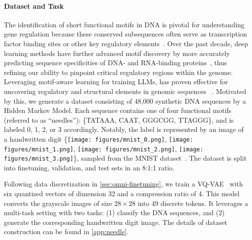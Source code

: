 \paragraph{Dataset and Task} The identification of short functional motifs in DNA is pivotal for understanding gene regulation because these conserved subsequences often serve as transcription factor binding sites or other key regulatory elements~\cite{tompa2005, avsec2021base}. Over the past decade, deep learning methods have further advanced motif discovery by more accurately predicting sequence specificities of DNA- and RNA-binding proteins~\cite{alipanahi2015predicting}, thus refining our ability to pinpoint critical regulatory regions within the genome. Leveraging motif-aware learning for training LLMs, has proven effective for uncovering regulatory and structural elements in genomic sequences ~\cite{wang2024multi, sanabria2024dna}. Motivated by this, we generate a dataset consisting of 48,000 synthetic DNA sequences by a Hidden Markov Model. Each sequence contains one of four functional motifs (referred to as ``needles''): \{TATAAA, CAAT, GGGCGG, TTAGGG\}, and is labeled 0, 1, 2, or 3 accordingly. Notably, the label is represented by an image of a handwritten digit \{\texttt{[image: figures/mnist\_0.png]}, \texttt{[image: figures/mnist\_1.png]}, \texttt{[image: figures/mnist\_2.png]}, \texttt{[image: figures/mnist\_3.png]}\}, sampled from the MNIST dataset~\cite{yadav2019cold}. The dataset is split into finetuning, validation, and test sets in an 8:1:1 ratio.


Following data discretization in \cref{sec:omni-finetuning}, we train a VQ-VAE~\cite{van2017neural} with six quantized vectors of dimension 32 and a compression ratio of 4. This model converts the grayscale images of size $28 \times 28$ into 49 discrete tokens. It leverages a multi-task setting with two tasks: (1) classify the DNA sequences, and (2) generate the corresponding handwritten digit image. The details of dataset construction can be found in \cref{app:needle}.


